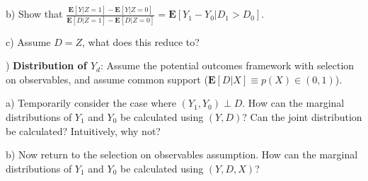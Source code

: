 \documentclass[12pt,english]{article}
\begin{document}
b) Show that $\frac{\mathbf{E}[Y | Z = 1] - \mathbf{E}[Y | Z = 0]}{\mathbf{E}[D | Z = 1] - \mathbf{E}[D | Z = 0]} = \mathbf{E}[Y_{1} - Y_{0} | D_{1} > D_{0}]$.

c) Assume $D = Z$, what does this reduce to?

\vspace{1em}
) \textbf{Distribution of $Y_{d}$}: Assume the potential outcomes framework with selection on observables, and assume common support ($\mathbf{E}[D | X] \equiv p(X) \in (0, 1)$).

a) Temporarily consider the case where $(Y_{1}, Y_{0}) \perp D$. How can the marginal distributions of $Y_{1}$ and $Y_{0}$ be calculated using $(Y, D)$? Can the joint distribution be calculated? Intuitively, why not?

b) Now return to the selection on observables assumption. How can the marginal distributions of $Y_{1}$ and $Y_{0}$ be calculated using $(Y, D, X)$?
\end{document}
